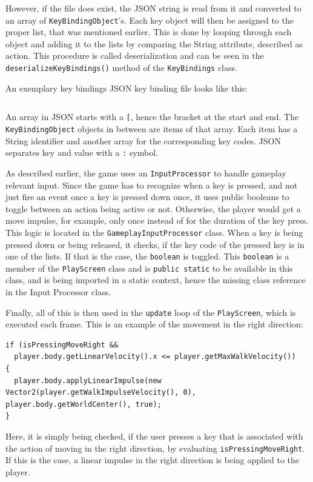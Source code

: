 \documentclass[12p]{article}
\begin{document}
However, if the file does exist, the JSON string is read from it and converted to an array of \texttt{KeyBindingObject}'s. Each key object will then be assigned to the proper list, that was mentioned earlier. This is done by looping through each object and adding it to the lists by comparing the String attribute, described as \texttt{}{action}. This procedure is called deserialization and can be seen in the \texttt{deserializeKeyBindings()} method of the \texttt{KeyBindings} class.

An exemplary key bindings JSON key binding file looks like this:
\inputminted[linenos,breaklines]{json}{code/json/keybindings.json}

An array in JSON starts with a \texttt{[}, hence the bracket at the start and end. The \texttt{KeyBindingObject} objects in between are items of that array. Each item has a String identifier and another array for the corresponding key codes. JSON separates key and value with a \texttt{:} symbol.

As described earlier, the game uses an \texttt{InputProcessor} to handle gameplay relevant input. Since the game has to recognize when a key is pressed, and not just fire an event once a key is pressed down once, it uses public booleans to toggle between an action being active or not. Otherwise, the player would get a move impulse, for example, only once instead of for the duration of the key press. This logic is located in the \texttt{GameplayInputProcessor} class. When a key is being pressed down or being released, it checks, if the key code of the pressed key is in one of the lists. If that is the case, the \texttt{boolean} is toggled. This \texttt{boolean} is a member of the \texttt{PlayScreen} class and is \texttt{public static} to be available in this class, and is being imported in a static context, hence the missing class reference in the Input Processor class.

Finally, all of this is then used in the \texttt{update} loop of the \texttt{PlayScreen}, which is executed each frame. This is an example of the movement in the right direction:

\begin{verbatim}
if (isPressingMoveRight &&
  player.body.getLinearVelocity().x <= player.getMaxWalkVelocity()) 
{
  player.body.applyLinearImpulse(new Vector2(player.getWalkImpulseVelocity(), 0), player.body.getWorldCenter(), true);
}
\end{verbatim}

Here, it is simply being checked, if the user presses a key that is associated with the action of moving in the right direction, by evaluating \texttt{isPressingMoveRight}. If this is the case, a linear impulse in the right direction is being applied to the player.
\end{document}
